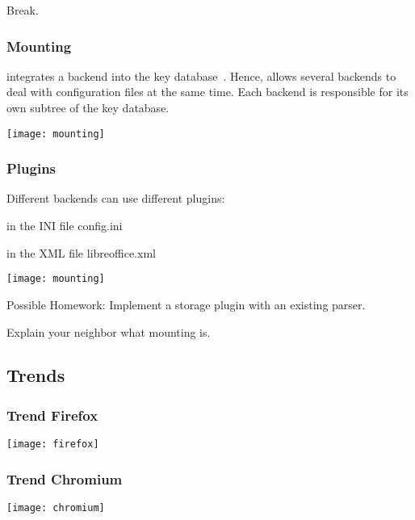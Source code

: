 \begin{assignment}
	\begin{task}
	Break.
	\end{task}
\end{assignment}

\begin{frame}
	\frametitle{Mounting}
	 integrates a backend into the key database~\cite{raab2008thesis}.
	Hence, \elektra{} allows several backends to deal with configuration files at the same time.
	Each backend is responsible for its own subtree of the key database.

	\texttt{[image: mounting]}
\end{frame}

\begin{frame}
	\frametitle{Plugins}

	Different backends can use different plugins:
	\begin{description}[labelsep=10cm,align=right]
	\item[\texttt{/sw}] in the INI file config.ini
	\item[\texttt{/sw/libreoffice}] in the XML file libreoffice.xml
	\end{description}

	\texttt{[image: mounting]}
\end{frame}

\begin{assignment}
	\begin{task}
	Possible Homework: Implement a storage plugin with an existing parser.
	\end{task}

	\begin{task}
	Explain your neighbor what mounting is.
	\end{task}
\end{assignment}


\subsection{Trends}

\begin{frame}
	\frametitle{Trend Firefox}
	\texttt{[image: firefox]}
\end{frame}

\begin{frame}
	\frametitle{Trend Chromium}
	\texttt{[image: chromium]}
\end{frame}

